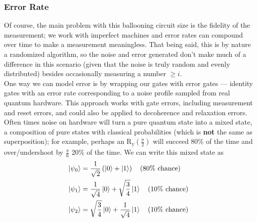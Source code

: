 \documentclass[12pt]{article}
\begin{document}
\subsubsection{Error Rate}
Of course, the main problem with this ballooning circuit size is the fidelity of the measurement; we work with imperfect machines and error rates can compound over time to make a measurement meaningless. 
That being said, this is by nature a randomized algorithm, so the noise and error generated don't make much of a difference in this scenario (given that the noise is truly random and evenly distributed) besides occasionally measuring a number $ \geq i$. \\
\indent One way we can model error is by wrapping our gates with error gates --- identity gates with an error rate corresponding to a noise profile sampled from real quantum hardware. This approach works with gate errors, including measurement and reset errors, and could also be applied to decoherence and relaxation errors. \\
\indent Often times noise on hardware will turn a pure quantum state into a mixed state, a composition of pure states with classical probabilities (which is \textbf{not} the same as superposition); for example, perhaps an R\textsubscript{y}$\left(\frac{\pi}{2}\right)$ will succeed $80\%$ of the time and over/undershoot by $\frac{\pi}{6}$ 20\% of the time. We can write this mixed state as
\begin{align*}
\ket{\psi_0} &= \frac{1}{\sqrt{2}} \left( \ket{0} + \ket{1} \right) \ \ \ \text{(80\% chance)} \\
\ket{\psi_1} &= \frac{1}{\sqrt{4}} \ket{0} + \sqrt{\frac{3}{4}} \ket{1} \ \ \ \text{(10\% chance)} \\
\ket{\psi_2} &= \sqrt{\frac{3}{4}} \ket{0} + \frac{1}{\sqrt{4}} \ket{1} \ \ \ \text{(10\% chance)}
\end{align*}
\end{document}
